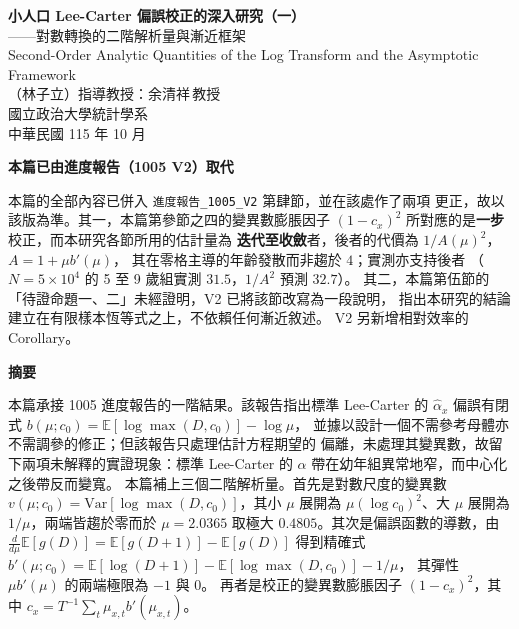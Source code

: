 \documentclass[UTF8, fontset=macnew, a4paper, 12pt]{ctexart}
\newcommand{\Ex}{\mathbb{E}}
\begin{document}
\begin{center}
{\bfseries 小人口 Lee-Carter 偏誤校正的深入研究（一）}\\[4pt]
{ ——對數轉換的二階解析量與漸近框架}\\[6pt]
{ Second-Order Analytic Quantities of the Log Transform and the
Asymptotic Framework}\\[12pt]
{ （林子立）\quad 指導教授：余清祥\,教授}\\[4pt]
{ 國立政治大學統計學系}\\[4pt]
{ 中華民國 115 年 10 月}
\end{center}

\vspace{6pt}
\begin{center}
\begin{minipage}{0.92\textwidth}
\small
\textbf{本篇已由進度報告（1005 V2）取代}\par\vspace{3pt}
本篇的全部內容已併入 \texttt{進度報告\_1005\_V2} 第肆節，並在該處作了兩項
更正，故以該版為準。其一，本篇第參節之四的變異數膨脹因子
$(1-c_x)^2$ 所對應的是\textbf{一步}校正，而本研究各節所用的估計量為
\textbf{迭代至收斂}者，後者的代價為 $1/A(\mu)^2$，$A=1+\mu b'(\mu)$，
其在零格主導的年齡發散而非趨於 $4$；實測亦支持後者
（$N=5\times10^4$ 的 5 至 9 歲組實測 $31.5$，$1/A^2$ 預測 $32.7$）。
其二，本篇第伍節的「待證命題一、二」未經證明，V2 已將該節改寫為一段說明，
指出本研究的結論建立在有限樣本恆等式之上，不依賴任何漸近敘述。
V2 另新增相對效率的 Corollary。
\par\vspace{6pt}
\textbf{摘要}\par\vspace{4pt}
本篇承接 1005 進度報告的一階結果。該報告指出標準 Lee-Carter 的
$\hat\alpha_x$ 偏誤有閉式 $b(\mu;c_0)=\Ex[\log\max(D,c_0)]-\log\mu$，
並據以設計一個不需參考母體亦不需調參的修正；但該報告只處理估計方程期望的
偏離，未處理其變異數，故留下兩項未解釋的實證現象：標準 Lee-Carter 的
$\alpha$ 帶在幼年組異常地窄，而中心化之後帶反而變寬。
本篇補上三個二階解析量。首先是對數尺度的變異數
$v(\mu;c_0)=\mathrm{Var}[\log\max(D,c_0)]$，其小 $\mu$ 展開為
$\mu(\log c_0)^2$、大 $\mu$ 展開為 $1/\mu$，兩端皆趨於零而於
$\mu=2.0365$ 取極大 $0.4805$。其次是偏誤函數的導數，由
$\frac{d}{d\mu}\Ex[g(D)]=\Ex[g(D{+}1)]-\Ex[g(D)]$ 得到精確式
$b'(\mu;c_0)=\Ex[\log(D{+}1)]-\Ex[\log\max(D,c_0)]-1/\mu$，
其彈性 $\mu b'(\mu)$ 的兩端極限為 $-1$ 與 $0$。
再者是校正的變異數膨脹因子 $(1-c_x)^2$，其中
$c_x=T^{-1}\sum_t\mu_{x,t}b'(\mu_{x,t})$。

\end{minipage}
\end{center}
\end{document}
